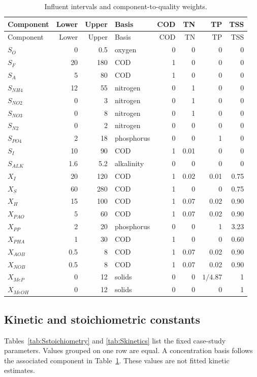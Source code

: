 \documentclass[a4paper,fleqn]{cas-sc}
\begin{document}
\begin{longtable}{lrrlrrrr}
\caption{Influent intervals and component-to-quality weights.}\label{tab:Sinfluent}\\
\toprule
Component & Lower & Upper & Basis & COD & TN & TP & TSS\\
\midrule
\endfirsthead
\toprule
Component & Lower & Upper & Basis & COD & TN & TP & TSS\\
\midrule
\endhead
$S_O$ & 0 & 0.5 & oxygen & 0 & 0 & 0 & 0\\
$S_F$ & 20 & 180 & COD & 1 & 0 & 0 & 0\\
$S_A$ & 5 & 80 & COD & 1 & 0 & 0 & 0\\
$S_{NH4}$ & 12 & 55 & nitrogen & 0 & 1 & 0 & 0\\
$S_{NO2}$ & 0 & 3 & nitrogen & 0 & 1 & 0 & 0\\
$S_{NO3}$ & 0 & 8 & nitrogen & 0 & 1 & 0 & 0\\
$S_{N2}$ & 0 & 2 & nitrogen & 0 & 0 & 0 & 0\\
$S_{PO4}$ & 2 & 18 & phosphorus & 0 & 0 & 1 & 0\\
$S_I$ & 10 & 90 & COD & 1 & 0.01 & 0 & 0\\
$S_{ALK}$ & 1.6 & 5.2 & alkalinity & 0 & 0 & 0 & 0\\
$X_I$ & 20 & 120 & COD & 1 & 0.02 & 0.01 & 0.75\\
$X_S$ & 60 & 280 & COD & 1 & 0 & 0 & 0.75\\
$X_H$ & 15 & 100 & COD & 1 & 0.07 & 0.02 & 0.90\\
$X_{PAO}$ & 5 & 60 & COD & 1 & 0.07 & 0.02 & 0.90\\
$X_{PP}$ & 2 & 20 & phosphorus & 0 & 0 & 1 & 3.23\\
$X_{PHA}$ & 1 & 30 & COD & 1 & 0 & 0 & 0.60\\
$X_{AOB}$ & 0.5 & 8 & COD & 1 & 0.07 & 0.02 & 0.90\\
$X_{NOB}$ & 0.5 & 8 & COD & 1 & 0.07 & 0.02 & 0.90\\
$X_{MeP}$ & 0 & 12 & solids & 0 & 0 & $1/4.87$ & 1\\
$X_{MeOH}$ & 0 & 12 & solids & 0 & 0 & 0 & 1\\
\bottomrule
\end{longtable}

\subsection{Kinetic and stoichiometric constants}
\label{sec:Sparameters}

Tables~\ref{tab:Sstoichiometry} and \ref{tab:Skinetics} list the fixed case-study parameters. Values grouped on one row are equal. A concentration basis follows the associated component in Table~\ref{tab:Sinfluent}. These values are not fitted kinetic estimates.
\end{document}
